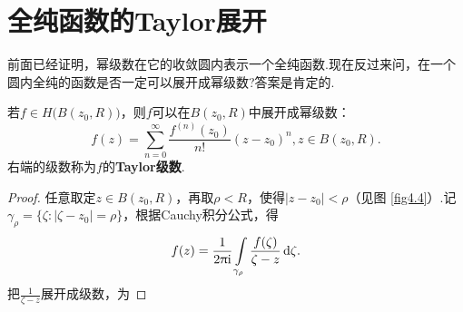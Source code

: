 \section{全纯函数的Taylor展开\label{sec4.3}}
前面已经证明，幂级数在它的收敛圆内表示一个全纯函数.现在反过来问，在一个圆内全纯的函数是否一定可以展开成幂级数?答案是肯定的.
\begin{theorem}\label{thm4.3.1}
  若$f\in H\big(B(z_0,R)\big)$，则$f$可以在$B(z_0,R)$中展开成幂级数：
  \begin{equation}\label{eq4.3.1}
    f(z) = \sum_{n=0}^\infty \frac{f^{(n)}(z_0)}{n!} (z-z_0)^n, z\in B(z_0,R).
  \end{equation}
  右端的级数称为$f$的\textbf{Taylor级数}.
\end{theorem}
\begin{proof}
  任意取定$z\in B(z_0,R)$，再取$\rho<R$，使得$|z-z_0|<\rho$（见图 \ref{fig4.4}）.记$\gamma_\rho=\{\zeta:|\zeta-z_0|=\rho\}$，根据Cauchy积分公式，得
  \[
    f(z) = \frac1{2\uppi\mathrm i} \int\limits_{\gamma_\rho} \frac{f(\zeta)}{\zeta-z}\mathop{}\!\mathrm{d} \zeta.
  \]
  把$\frac1{\zeta-z}$展开成级数，为


\end{proof}
